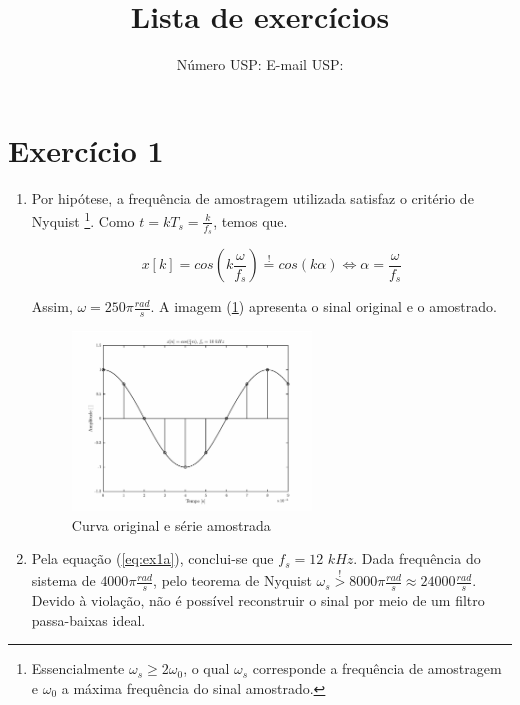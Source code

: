 \documentclass[twoside, fleqn]{article}
\title{Lista de exercícios \esnumber}
\author{\studentname \qquad Número USP: \uspid \qquad E-mail USP: \uspmail}
\begin{document}
\maketitle


\listoffigures
\lstlistoflistings

\newpage

\section*{Exercício 1}

    \begin{enumerate}

        \item %
        
        Por hipótese, a frequência de amostragem utilizada satisfaz o critério de Nyquist \footnote{Essencialmente $\omega_s \geq 2\omega_0$, o qual $\omega_s$ corresponde a frequência de amostragem e $\omega_0$ a máxima frequência do sinal amostrado.}. Como $t = kT_s = \frac{k}{f_s}$, temos que.
        
            \begin{equation}
                \label{eq:ex1a}
                    x[k] = cos(k \frac{\omega}{f_s})  \stackrel{!}{=} cos(k \alpha) \Longleftrightarrow \alpha = \frac{\omega}{f_s}
            \end{equation}
        
        Assim, $\omega = 250\pi \frac{rad}{s}$. A imagem (\ref{fig:ex1}) apresenta o sinal original e o amostrado.
        
            \begin{figure}[H]
            	\center
            	\includegraphics[width=0.6\textwidth]{./images/ex1a.eps}
            	\caption{Curva original e série amostrada}
            	\label{fig:ex1}
            \end{figure}
        
        \item %
        Pela equação (\ref{eq:ex1a}), conclui-se que $f_s = 12$ $kHz$. Dada frequência do sistema de $4000\pi \frac{rad}{s}$, pelo teorema de Nyquist $\omega_s \stackrel{!}{>} 8000\pi \frac{rad}{s} \approx 24000 \frac{rad}{s}$. Devido à violação, não é possível reconstruir o sinal por meio de um filtro passa-baixas ideal. 
        

\end{enumerate}
\end{document}
